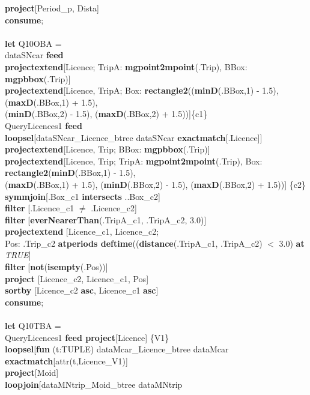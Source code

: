 \documentclass[a4paper]{article}
\newcommand{\op}[1]{\textbf{#1}}
\newcommand{\true}{\textsl{TRUE}}
\begin{document}
\begin{scriptsize}
\begin{tabbing}
\>\op{project}[Period\_p, Dista]\\
\op{consume};\\
\\
\op{let} Q10OBA =\\
\>dataSNcar \op{feed}\\
\>\>\op{projectextend}[Licence; TripA: \op{mgpoint2mpoint}(.Trip), BBox:
\op{mgpbbox}(.Trip)]\\
\>\>\op{projectextend}[Licence, TripA; Box: \op{rectangle2}((\op{minD}(.BBox,1)
- 1.5), (\op{maxD}(.BBox,1) + 1.5),\\
\>\>\>\>(\op{minD}(.BBox,2) - 1.5), (\op{maxD}(.BBox,2) + 1.5))]\{c1\}\\
\>QueryLicences1 \op{feed}\\
\>\>\op{loopsel}[dataSNcar\_Licence\_btree dataSNcar
\op{exactmatch}[.Licence]]\\
\>\>\op{projectextend}[Licence, Trip;  BBox: \op{mgpbbox}(.Trip)]\\
\>\>\op{projectextend}[Licence, Trip; TripA: \op{mgpoint2mpoint}(.Trip), Box:
\op{rectangle2}(\op{minD}(.BBox,1) - 1.5),\\
\>\>\>\>(\op{maxD}(.BBox,1) + 1.5), (\op{minD}(.BBox,2) - 1.5),
(\op{maxD}(.BBox,2) + 1.5))] \{c2\}\\
\>\op{symmjoin}[.Box\_c1 \op{intersects} ..Box\_c2]\\
\>\op{filter} [.Licence\_c1 $\neq$ .Licence\_c2]\\
\>\op{filter} [\op{everNearerThan}(.TripA\_c1, .TripA\_c2, 3.0)]\\
\>\op{projectextend} [Licence\_c1, Licence\_c2; \\
\>\>\>\>Pos: .Trip\_c2 \op{atperiods deftime}((\op{distance}(.TripA\_c1,
.TripA\_c2) $<$ 3.0) \op{at} \true{}]\\
\>\op{filter} [\op{not}(\op{isempty}(.Pos))]\\
\>\op{project} [Licence\_c2, Licence\_c1, Pos]\\
\>\op{sortby} [Licence\_c2 \op{asc}, Licence\_c1 \op{asc}]\\
\op{consume};\\
\\
\op{let} Q10TBA =\\
\>QueryLicences1 \op{feed project}[Licence] \{V1\}\\
\>\op{loopsel}[\op{fun} (t:TUPLE) dataMcar\_Licence\_btree dataMcar
\op{exactmatch}[attr(t,Licence\_V1)]\\
\>\>\op{project}[Moid]\\
\>\>\op{loopjoin}[dataMNtrip\_Moid\_btree dataMNtrip

\end{tabbing}
\end{scriptsize}
\end{document}
